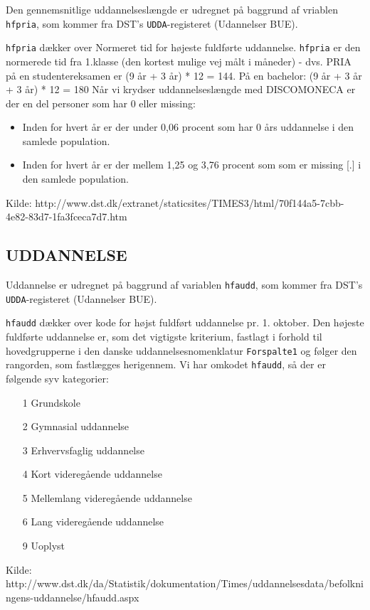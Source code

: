Den gennemsnitlige uddannelseslængde er udregnet på baggrund af vriablen \texttt{hfpria}, som kommer fra DST's \texttt{UDDA}-registeret (Udannelser BUE).

\texttt{hfpria} dækker over Normeret tid for højeste fuldførte uddannelse. \texttt{hfpria} er den normerede tid fra 1.klasse (den kortest mulige vej målt i måneder) - dvs. PRIA på en studentereksamen er (9 år + 3 år) * 12 = 144. På en bachelor: (9 år + 3 år + 3 år) * 12 = 180
%
Når vi krydser uddannelseslængde med DISCOMONECA er der en del personer som har 0 eller missing:
% 
\begin{itemize}
  \item Inden for hvert år er der under 0,06 procent som har 0 års uddannelse i den samlede population.
  \item Inden for hvert år er der mellem 1,25 og 3,76 procent som som er missing [.] i den samlede population.
\end{itemize}
%
Kilde: http://www.dst.dk/extranet/staticsites/TIMES3/html/70f144a5-7cbb-4e82-83d7-1fa3fceca7d7.htm


\subsection{UDDANNELSE \label{}}

Uddannelse er udregnet på baggrund af variablen \texttt{hfaudd}, som kommer fra DST's \texttt{UDDA}-registeret (Udannelser BUE).

\texttt{hfaudd} dækker over kode for højst fuldført uddannelse pr. 1. oktober. Den højeste fuldførte uddannelse er, som det vigtigste kriterium, fastlagt i forhold til hovedgrupperne i den danske uddannelsesnomenklatur \texttt{Forspalte1} og følger den rangorden, som fastlægges herigennem.
%
Vi har omkodet \texttt{hfaudd}, så der er følgende syv kategorier:
% 
\begin{enumerate} [topsep=6pt,itemsep=-1ex]
  \item [1] Grundskole
  \item [2] Gymnasial uddannelse
  \item [3] Erhvervsfaglig uddannelse
  \item [4] Kort videregående uddannelse
  \item [5] Mellemlang videregående uddannelse
  \item [6] Lang videregående uddannelse
  \item [9] Uoplyst
\end{enumerate}
%
Kilde: http://www.dst.dk/da/Statistik/dokumentation/Times/uddannelsesdata/befolkningens-uddannelse/hfaudd.aspx


